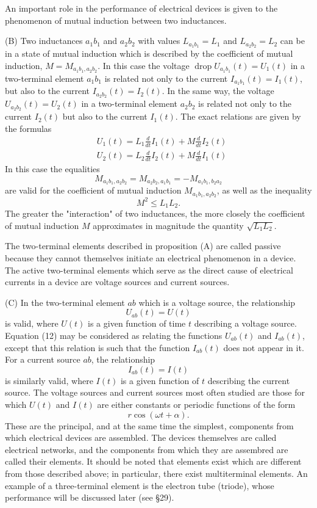 \documentclass[10pt,a5paper]{book}
\theoremstyle{plain}
\theoremstyle{definition}
\theoremstyle{remark}
\begin{document}
An important role in the performance of electrical devices is given to the phenomenon of mutual induction between two inductances.

(B) Two inductances $a_{1} b_{1}$ and $a_{2} b_{2}$ with values $L_{a_{1} b_{1}}=L_{1}$ and $L_{a_{2} b_{2}}=L_{2}$ can be in a state of mutual induction which is described by the coefficient of mutual induction, $M=M_{a_{1} b_{1}, a_{2} b_{2}}$. In this case the voltage $\operatorname{drop} U_{a_{1} b_{1}}(t)=U_{1}(t)$ in a two-terminal element $a_{1} b_{1}$ is related not only to the current $I_{a_{1} b_{1}}(t)=I_{1}(t)$, but also to the current $I_{a_{2} b_{2}}(t)=I_{2}(t)$. In the same way, the voltage $U_{a_{2} b_{2}}(t)=U_{2}(t)$ in a two-terminal element $a_{2} b_{2}$ is related not only to the current $I_{2}(t)$ but also to the current $I_{1}(t)$. The exact relations are given by the formulas
\begin{align*}
& U_{1}(t)=L_{1} \frac{d}{d t} I_{1}(t)+M \frac{d}{d t} I_{2}(t)  \tag{10}\\
& U_{2}(t)=L_{2} \frac{d}{d t} I_{2}(t)+M \frac{d}{d t} I_{1}(t) \tag{11}
\end{align*}
In this case the equalities
\[
M_{a_{1} b_{1}, a_{2} b_{2}}=M_{a_{2} b_{2}, a_{1} b_{1}}=-M_{a_{1} b_{1}, b_{2} a_{2}}
\]
are valid for the coefficient of mutual induction $M_{a_{1} b_{1}, a_{2} b_{2}}$, as well as the inequality
\[
M^{2} \leq L_{1} L_{2} .
\]
The greater the "interaction" of two inductances, the more closely the coefficient of mutual induction $M$ approximates in magnitude the quantity $\sqrt{L_{1} L_{2}}$.

The two-terminal elements described in proposition (A) are called passive because they cannot themselves initiate an electrical phenomenon in a device. The active two-terminal elements which serve as the direct cause of electrical currents in a device are voltage sources and current sources.

(C) In the two-terminal element $a b$ which is a voltage source, the relationship
\begin{equation*}
U_{a b}(t)=U(t) \tag{12}
\end{equation*}
is valid, where $U(t)$ is a given function of time $t$ describing a voltage source. Equation (12) may be considered as relating the functions $U_{a b}(t)$ and $I_{a b}(t)$, except that this relation is such that the function $I_{a b}(t)$ does not appear in it. For a current source $a b$, the relationship
\[
I_{a b}(t)=I(t)
\]
is similarly valid, where $I(t)$ is a given function of $t$ describing the current source. The voltage sources and current sources most often studied are
those for which $U(t)$ and $I(t)$ are either constants or periodic functions of the form
\[
r \cos (\omega t+\alpha) .
\]
These are the principal, and at the same time the simplest, components from which electrical devices are assembled. The devices themselves are called electrical networks, and the components from which they are assembred are called their elements. It should be noted that elements exist which are different from those described above; in particular, there exist multiterminal elements. An example of a three-terminal element is the electron tube (triode), whose performance will be discussed later (see §29).
\end{document}
